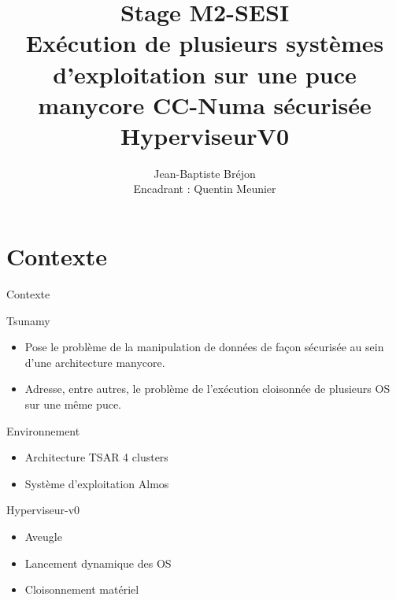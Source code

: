\documentclass[12pt,francais]{beamer}
\title{Stage M2-SESI \\ \textbf{Exécution de plusieurs systèmes d'exploitation sur une puce manycore CC-Numa sécurisée}\\HyperviseurV0}
\author{Jean-Baptiste Bréjon\\
Encadrant : Quentin Meunier}
\date{}
\begin{document}
\maketitle

\section*{Contexte}
\begin{frame}{Contexte}
        \begin{center}
                \begin{block}{Tsunamy}
                        \begin{itemize}
                                \item Pose le problème de la manipulation de données de façon sécurisée au sein d'une architecture manycore.
                                \item Adresse, entre autres, le problème de l'exécution cloisonnée de plusieurs OS sur une même puce.
                        \end{itemize}
                \end{block}
                \begin{block}{Environnement}
                        \begin{itemize}
                                \item Architecture TSAR 4 clusters 
                                \item Système d'exploitation Almos
                        \end{itemize}
                \end{block}
        \end{center}
\end{frame}

\begin{frame}{Hyperviseur-v0}
        \begin{center}
                \begin{itemize}
                        \item Aveugle
                        \item Lancement dynamique des OS
                        \item Cloisonnement matériel
                \end{itemize}
        \end{center}
\end{frame}
\end{document}
